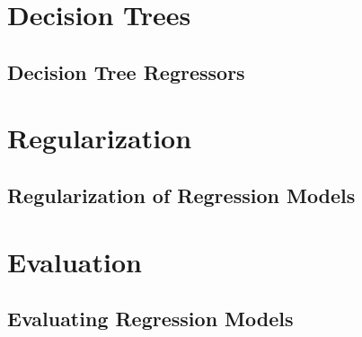 \documentclass[12pt letter]{report}
\begin{document}
\chapter{Decision Trees}
\section{Decision Tree Regressors}

\chapter{Regularization}
\section{Regularization of Regression Models}

\chapter{Evaluation}
\section{Evaluating Regression Models}
\end{document}
